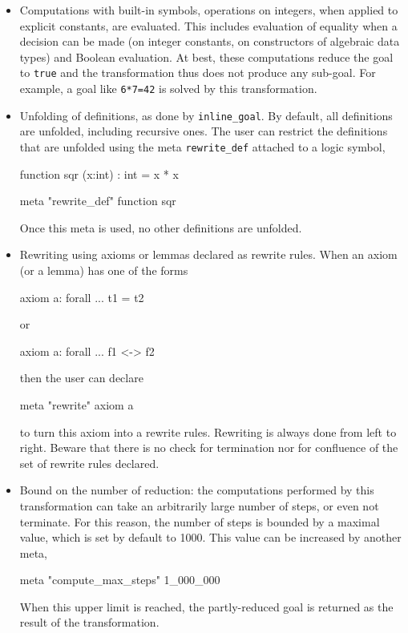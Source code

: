 \begin{itemize}
\item Computations with built-in symbols, \eg operations on integers,
  when applied to explicit constants, are evaluated. This includes
  evaluation of equality when a decision can be made (on integer
  constants, on constructors of algebraic data types) and Boolean
  evaluation. At best, these computations reduce the goal to
  \verb|true| and the transformation thus does not produce any sub-goal.
  For example, a goal
  like \verb|6*7=42| is solved by this transformation.
\item Unfolding of definitions, as done by \verb|inline_goal|. By
  default, all definitions are unfolded, including recursive ones. The
  user can restrict the definitions that are unfolded using the meta
  \verb|rewrite_def| attached to a logic symbol, \eg
\begin{whycode}
function sqr (x:int) : int = x * x

meta "rewrite_def" function sqr
\end{whycode}
  Once this meta is used, no other definitions are unfolded.
\item Rewriting using axioms or lemmas declared as rewrite rules. When
  an axiom (or a lemma) has one of the forms
\begin{whycode}
axiom a: forall ... t1 = t2
\end{whycode}
  or
\begin{whycode}
axiom a: forall ... f1 <-> f2
\end{whycode}
  then the user can declare
\begin{whycode}
meta "rewrite" axiom a
\end{whycode}
  to turn this axiom into a rewrite rules. Rewriting is always done
  from left to right. Beware that there is no check for termination
  nor for confluence of the set of rewrite rules declared.
\item Bound on the number of reduction: the computations performed by
  this transformation can take an arbitrarily large number of steps,
  or even not terminate. For this reason, the number of steps is
  bounded by a maximal value, which is set by default to 1000. This
  value can be increased by another meta, \eg
\begin{whycode}
meta "compute_max_steps" 1_000_000
\end{whycode}
  When this upper limit is reached, the partly-reduced goal
  is returned as the result of the transformation.
\end{itemize}



